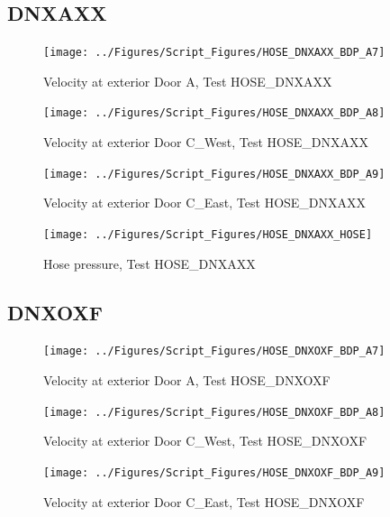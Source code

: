 \documentclass[12pt,oneside]{book}
\begin{document}
\subsection{DNXAXX}

\begin{figure}[!ht]
\texttt{[image: ../Figures/Script\_Figures/HOSE\_DNXAXX\_BDP\_A7]}
\caption{Velocity at exterior Door A, Test HOSE\_DNXAXX}
\label{fig:HOSE_DNXAXX_BDP_A7}
\end{figure}

\begin{figure}[!ht]
\texttt{[image: ../Figures/Script\_Figures/HOSE\_DNXAXX\_BDP\_A8]}
\caption{Velocity at exterior Door C\_West, Test HOSE\_DNXAXX}
\label{fig:HOSE_DNXAXX_BDP_A8}
\end{figure}

\begin{figure}[!ht]
\texttt{[image: ../Figures/Script\_Figures/HOSE\_DNXAXX\_BDP\_A9]}
\caption{Velocity at exterior Door C\_East, Test HOSE\_DNXAXX}
\label{fig:HOSE_DNXAXX_BDP_A9}
\end{figure}

\begin{figure}[!ht]
\texttt{[image: ../Figures/Script\_Figures/HOSE\_DNXAXX\_HOSE]}
\caption{Hose pressure, Test HOSE\_DNXAXX}
\label{fig:HOSE_DNXAXX_HOSE}
\end{figure}


\clearpage


\subsection{DNXOXF}

\begin{figure}[!ht]
\texttt{[image: ../Figures/Script\_Figures/HOSE\_DNXOXF\_BDP\_A7]}
\caption{Velocity at exterior Door A, Test HOSE\_DNXOXF}
\label{fig:HOSE_DNXOXF_BDP_A7}
\end{figure}

\begin{figure}[!ht]
\texttt{[image: ../Figures/Script\_Figures/HOSE\_DNXOXF\_BDP\_A8]}
\caption{Velocity at exterior Door C\_West, Test HOSE\_DNXOXF}
\label{fig:HOSE_DNXOXF_BDP_A8}
\end{figure}

\begin{figure}[!ht]
\texttt{[image: ../Figures/Script\_Figures/HOSE\_DNXOXF\_BDP\_A9]}
\caption{Velocity at exterior Door C\_East, Test HOSE\_DNXOXF}
\label{fig:HOSE_DNXOXF_BDP_A9}
\end{figure}
\end{document}
